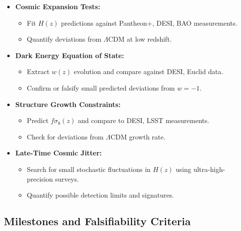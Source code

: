 \documentclass{article}
\begin{document}
\begin{itemize}
    \item \textbf{Cosmic Expansion Tests:}
    \begin{itemize}
        \item Fit $H(z)$ predictions against Pantheon+, DESI, BAO measurements.
        \item Quantify deviations from $\Lambda$CDM at low redshift.
    \end{itemize}

    \item \textbf{Dark Energy Equation of State:}
    \begin{itemize}
        \item Extract $w(z)$ evolution and compare against DESI, Euclid data.
        \item Confirm or falsify small predicted deviations from $w = -1$.
    \end{itemize}

    \item \textbf{Structure Growth Constraints:}
    \begin{itemize}
        \item Predict $f\sigma_8(z)$ and compare to DESI, LSST measurements.
        \item Check for deviations from $\Lambda$CDM growth rate.
    \end{itemize}

    \item \textbf{Late-Time Cosmic Jitter:}
    \begin{itemize}
        \item Search for small stochastic fluctuations in $H(z)$ using ultra-high-precision surveys.
        \item Quantify possible detection limits and signatures.
    \end{itemize}
\end{itemize}



\subsection{Milestones and Falsifiability Criteria}
\end{document}
